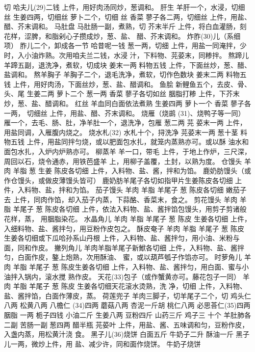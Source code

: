 \documentclass[12pt,UTF8]{ctexbook}
\begin{document}
切 哈夫儿(29)二钱
上件，用好肉汤同炒，葱调和。
肝生
羊肝一个，水浸，切细丝 生姜四两，切细丝 萝卜二个，切细
丝 香菜 蓼子各二两，切细丝
上件，用盐、醋、芥末调和。
马肚盘
马肚肠一副，煮熟，切 芥末半斤
上件，将白血灌肠，刻花样，涩脾，和脂剁心子攒成炒，葱、盐、
醋、芥末调和。
炸胙(30)儿（系细项）
胙儿二个，卸成各一节 哈昔呢一钱 葱一两，切细
上件，用盐一同淹拌，少时，入小油炸熟。次用咱夫兰二钱，水浸
汁，下料物、芫荽末，同糁拌。
熬蹄儿
羊蹄五副，退洗净，煮软，切成块 姜末一两 料物五钱
上件，下面丝炒，葱、醋、盐调和。
熬羊胸子
羊胸子二个，退毛洗净，煮软，切作色数块 姜末二两 料物五钱
上件，用好肉汤，下面丝炒，葱、盐、醋调和。
鱼脍
新鲤鱼五个，去皮、骨、头、尾 生姜二两 萝卜二个 葱一两
香菜 蓼子各切如丝 胭脂打糁
上件，下芥末炒，葱、盐、醋调和。
红丝
羊血同白面依法煮熟 生姜四两 萝卜一个 香菜 蓼子各一两，
切细丝
上件，用盐、醋、芥末调和。
烧雁（烧鹚 (31)、烧鸭子等一同）
雁一个，去毛、肠、肚，净羊肚一个，退洗净，包雁 葱二两 芫
荽末一两
上件，用盐同调，入雁腹内烧之。
烧水札(32)
水札十个，挦洗净 芫荽末一两 葱十茎 料物五钱
上件，用盐同拌匀烧，或以肥面包水扎，就笼内蒸熟亦可。或以酥
油水和面包水扎，入炉内炉熟亦可。
柳蒸羊
羊一口，带毛
上件，于地上作炉，三尺深，周回以石，烧令通赤，用铁芭盛羊
上，用柳子盖覆，土封，以熟为度。
仓馒头
羊肉 羊脂 葱 生姜 陈皮各切细
上件，入料物、盐、酱，拌和为馅。
鹿奶肪馒头（或作仓馒头，或做皮薄馒头皆可）
鹿奶肪羊尾子各切如指甲片生姜陈皮各切细
上件，入料物、盐，拌和为馅。
茄子馒头
羊肉 羊脂 羊尾子 葱 陈皮各切细 嫩茄子去
上件，同肉作馅，却入茄子内蒸，下蒜酪、香菜末，食之。
剪花馒头
羊肉 羊脂 羊尾子 葱 陈皮各切细
上件，依法入料物、盐、酱拌馅包馒头，用剪子剪诸般花样，蒸，
用胭脂染花。
水晶角儿
羊肉 羊脂 羊尾子 葱 陈皮 生姜各切细
上件，入细料物、盐、酱拌匀，用豆粉作皮包之。
酥皮奄子
羊肉 羊脂 羊尾子 葱 陈皮 生姜各切细或下瓜哈孙系山丹根
上件，入料物、盐、酱拌匀，用小油、米粉与面，同和作皮。
撇列角儿
羊肉羊脂羊尾子新鮲各切细
上件，入料物、盐、酱拌匀，白面作皮，鏊上炮熟，次用酥油、
蜜，或以葫芦瓠子作馅亦可。
时萝角儿
羊肉 羊脂 羊尾子 葱 陈皮生姜各切细
上件，入料物、盐、酱拌匀，用白面、蜜与小油拌入锅内，滚水搅
熟作皮。
天花(33)包子（或作蟹黄亦可。藤花包子一同）
羊肉 羊脂 羊尾子 葱 陈皮 生姜各切细天花滚水烫熟，洗
净，切细
上件，入料物、盐、酱拌馅，白面作薄皮，蒸。
荷莲兜子
羊肉三脚子，切羊尾子二个，切 鸡头仁八两 松黄八两 八檐仁
(34)四两 蘑菇八两 杏泥一斤胡 桃仁八两 必思荅仁(35)四两 胭脂
一两 栀子四钱 小油二斤 生姜八两 豆粉四斤 山药三斤 鸡子三
十个 羊肚肺各二副 苦肠一副 葱四两 醋半瓶 芫荽叶
上件，用盐、酱、五味调和匀，豆粉作皮，入盏内蒸，用松黄汁浇
食。
黑子儿(36)烧饼
白面五斤 牛奶子二升 酥油一斤 黑子儿一两，微炒上件，用
盐、减少许，同和面作烧饼。
牛奶子烧饼
\end{document}

